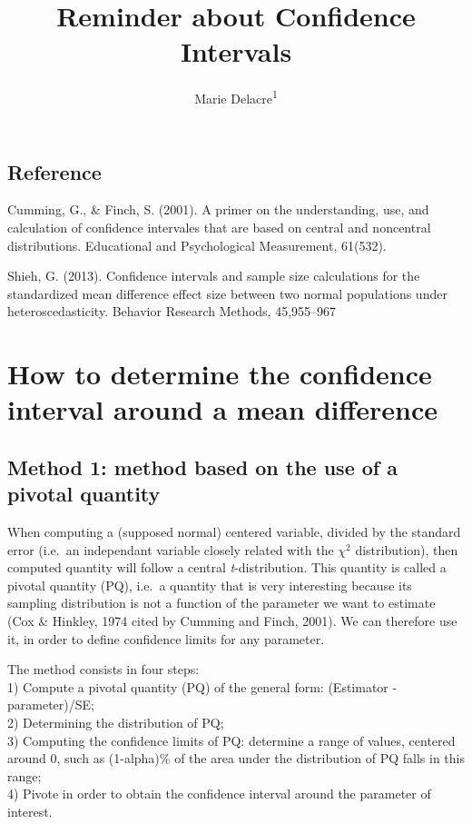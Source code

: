 \documentclass[man,floatsintext]{apa6}
\title{Reminder about Confidence Intervals}
\author{Marie Delacre\textsuperscript{1}}
\date{}
\affiliation{
\vspace{0.5cm}
\textsuperscript{1} ULB}
\begin{document}
\maketitle

\hypertarget{reference}{%
\subsection{Reference}\label{reference}}

Cumming, G., \& Finch, S. (2001). A primer on the understanding, use, and calculation of confidence intervales that are based on central and noncentral distributions. Educational and Psychological Measurement, 61(532).

Shieh, G. (2013). Confidence intervals and sample size calculations for the standardized mean difference effect size between two normal populations under heteroscedasticity. Behavior Research Methods, 45,955--967

\hypertarget{how-to-determine-the-confidence-interval-around-a-mean-difference}{%
\section{How to determine the confidence interval around a mean difference}\label{how-to-determine-the-confidence-interval-around-a-mean-difference}}

\hypertarget{method-1-method-based-on-the-use-of-a-pivotal-quantity}{%
\subsection{Method 1: method based on the use of a pivotal quantity}\label{method-1-method-based-on-the-use-of-a-pivotal-quantity}}

When computing a (supposed normal) centered variable, divided by the standard error (i.e.~an independant variable closely related with the \(\chi^2\) distribution), then computed quantity will follow a central \emph{t}-distribution. This quantity is called a pivotal quantity (PQ), i.e.~a quantity that is very interesting because its sampling distribution is not a function of the parameter we want to estimate (Cox \& Hinkley, 1974 cited by Cumming and Finch, 2001). We can therefore use it, in order to define confidence limits for any parameter.

The method consists in four steps:\\
1) Compute a pivotal quantity (PQ) of the general form: (Estimator - parameter)/SE;\\
2) Determining the distribution of PQ;\\
3) Computing the confidence limits of PQ: determine a range of values, centered around 0, such as (1-alpha)\% of the area under the distribution of PQ falls in this range;\\
4) Pivote in order to obtain the confidence interval around the parameter of interest.
\end{document}
